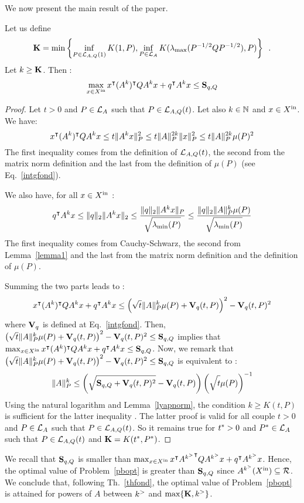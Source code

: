 \documentclass[10pt]{article}
\begin{document}
We now present the main result of the paper.
\begin{theorem}
\label{thfond}
Let us define \[\mathbf{K}=\min\left\{\inf_{P\in\mathcal{L}_{A,Q}(1)} K(1,P),\inf_{P\in\mathcal{L}_{A}} K(\lambda_{\operatorname{max}}(P^{-1/2}QP^{-1/2}),P)\right\}\enspace .\] Let $k\geq \mathbf{K}$. Then : 
\[
\max_{x\in X^\mathrm{in}} x^\intercal (A^k)^\intercal Q A^k x+q^\intercal A^k x\leq \mathbf{S}_{q,Q}
\]
\end{theorem}

\begin{proof}
Let $t>0$ and $P\in\mathcal{L}_{A}$ such that $P\in\mathcal{L}_{A,Q}(t)$. Let also $k\in\mathbb{N}$ and $x\in X^\mathrm{in}$. We have:
\[
x^\intercal (A^k)^\intercal Q A^k x  
\leq  t \| A^k x\|_P^2\leq t\| A\|^{2k}_P \| x\|^2_P
\leq t\| A\|_P^{2k} \mu(P)^2
\]
The first inequality comes from the definition of $\mathcal{L}_{A,Q}(t)$, the second from the matrix norm definition and the last from the definition of $\mu(P)$ (see Eq.~\eqref{intgfond}).

We also have, for all $x\in X^\mathrm{in}$ :
\[
q^\intercal A^k x
\leq \| q\|_2 \| A^k x\|_2\leq \dfrac{\| q\|_2 \| A^k x\|_P}{\sqrt{\strut \lambda_{\operatorname{min}}(P)}} 
\leq \dfrac{\| q\|_2\| A\|_P^{k} \mu(P)}{\sqrt{\strut \lambda_{\operatorname{min}}(P)}}
\]
The first inequality comes from Cauchy-Schwarz, the second from Lemma~\ref{lemma1} and the last from the matrix norm definition and the definition of $\mu(P)$. 

Summing the two parts leads to :
\[
x^\intercal (A^k)^\intercal Q A^k x+q^\intercal A^k x\leq \left(\sqrt{t}\| A\|_P^k\mu(P)+\mathbf{V}_{q}(t,P)\right)^2-\mathbf{V}_{q}(t,P)^2
\]
where $\mathbf{V}_{q}$ is defined at Eq.~\eqref{intgfond}. Then, $ \left(\sqrt{t}\| A\|_P^k\mu(P)+\mathbf{V}_{q}(t,P)\right)^2-\mathbf{V}_{q}(t,P)^2\leq \mathbf{S}_{q,Q}$ implies that $ \max_{x\in X^\mathrm{in}} x^\intercal (A^k)^\intercal Q A^k x+q^\intercal A^k x\leq \mathbf{S}_{q,Q}$. Now, we remark that  $\left(\sqrt{t}\| A\|_P^k\mu(P)+\mathbf{V}_{q}(t,P)\right)^2-\mathbf{V}_{q}(t,P)^2\leq \mathbf{S}_{q,Q}$ is equivalent to :
\[
\| A\|_P^k\leq \left(\sqrt{\strut \mathbf{S}_{q,Q}+\mathbf{V}_{q}(t,P)^2}-\mathbf{V}_{q}(t,P)\right)\left(\sqrt{\strut t}\mu(P)\right)^{-1}
\]
Using the natural logarithm and Lemma~\ref{lyapnorm}, the condition  $k\geq K(t,P)$ is sufficient for the latter inequality .  The latter proof is valid for all couple $t>0$ and $P\in\mathcal{L}_{A}$ such that $P\in\mathcal{L}_{A,Q}(t)$. So it remains true for   $t^*>0$ and $P^*\in\mathcal{L}_{A}$ such that $P\in\mathcal{L}_{A,Q}(t)$ and $\mathbf{K}=K(t^*,P^*)$. 
\end{proof}
We recall that $\mathbf{S}_{q,Q}$ is smaller than $\max_{x\in X^\mathrm{in}} x^\intercal {A^{k^{>}}}^\intercal Q A^{k^{>}} x+q^\intercal A^{k^{>}} x$. Hence, the optimal value of Problem~\ref{pbopt} is greater than $\mathbf{S}_{q,Q}$ since $A^{k^{>}} (X^\mathrm{in})\subseteq \mathcal{R}$. We conclude that, following Th.~\ref{thfond}, the optimal value of Problem~\ref{pbopt} is attained for powers of $A$ between $k^{>}$  and $\max\{\mathbf{K},k^{>}\}$.
\end{document}
